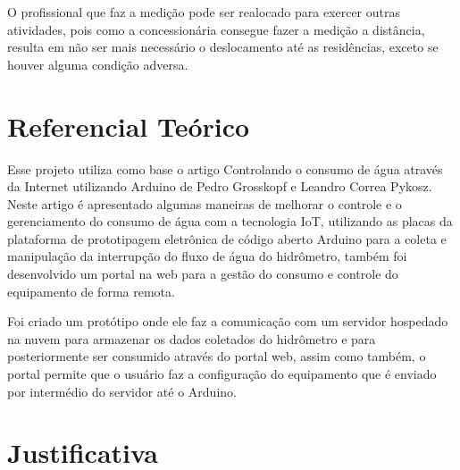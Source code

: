 \documentclass[
	article,			%
	11pt,				%
	oneside,			%
	a4paper,			%
	english,			%
	brazil,				%
	sumario=tradicional,
	doublespacing
	]{abntex2}
\begin{document}
\begin{DoubleSpace}
    O profissional que faz a medição pode ser realocado para exercer outras atividades, pois como a concessionária consegue fazer a medição a distância, resulta em não ser mais necessário o deslocamento até as residências, exceto se houver alguma condição adversa.
    \newpage
\section{Referencial Teórico}
    
    
    Esse projeto utiliza como base o artigo Controlando o consumo de água através da Internet utilizando Arduino de Pedro Grosskopf e Leandro Correa Pykosz. Neste artigo é apresentado algumas maneiras de melhorar o controle e o gerenciamento do consumo de água com a tecnologia IoT, utilizando as placas da plataforma de prototipagem eletrônica de código aberto Arduino para a coleta e manipulação da interrupção do fluxo de água do hidrômetro, também foi desenvolvido um portal na web para a gestão do consumo e controle do equipamento\cite{INOVA} de forma remota.
    
    Foi criado um protótipo onde ele faz a comunicação com um servidor hospedado na nuvem para armazenar os dados coletados do hidrômetro e para posteriormente ser consumido através do portal web, assim como também, o portal permite que o usuário faz a configuração do equipamento que é enviado por intermédio do servidor até o Arduino.

\section{Justificativa}


\end{DoubleSpace}
\end{document}
